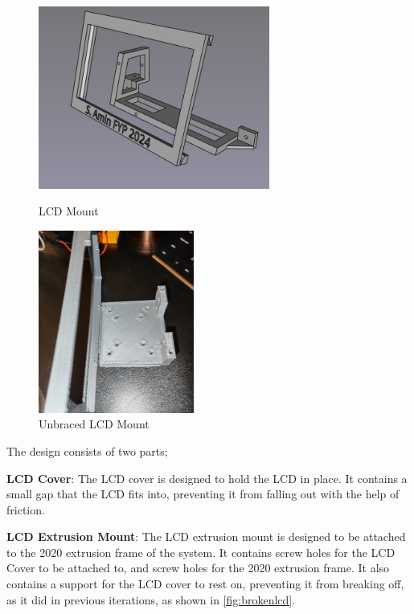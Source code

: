 \begin{figure}[ht]
    \centering
    \begin{minipage}{0.45\textwidth}
        \centering
        \includegraphics[height=6cm]{imgs/freecad/lcd_mount2.jpg}
        \caption{LCD Mount}
    \end{minipage}\hfill
    \begin{minipage}{0.45\textwidth}
        \centering
        \includegraphics[height=6cm]{imgs/design/unbracedscreen.jpeg}
        \caption{Unbraced LCD Mount}
        \label{fig:brokenlcd}
    \end{minipage}
\end{figure}

The design consists of two parts;
\begin{mylist}
    \item \textbf{LCD Cover}: The LCD cover is designed to hold the LCD in place. It contains a small gap that the LCD fits into, preventing it from falling out with the help of friction.
    \item \textbf{LCD Extrusion Mount}: The LCD extrusion mount is designed to be attached to the 2020 extrusion frame of the system. It contains screw holes for the LCD Cover to be attached to, and screw holes for the 2020 extrusion frame. It also contains a support for the LCD cover to rest on, preventing it from breaking off, as it did in previous iterations, as shown in \autoref{fig:brokenlcd}.
\end{mylist}


